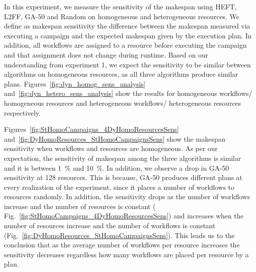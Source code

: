 In this experiment, we measure the sensitivity of the makespan using HEFT, L2FF, GA-50 and Random on homogeneous and heterogeneous resources.
We define as makespan sensitivity the difference between the makespan measured via executing a campaign and the expected makespan given by the execution plan.
In addition, all workflows are assigned to a resource before executing the campaign and that assignment does not change during runtime.
Based on our understanding from experiment 1, we expect the sensitivity to be similar between algorithms on homogeneous resources, as all three algorithms produce similar plans.
Figures~\ref{fig:dyn_homog_sens_analysis} and~\ref{fig:dyn_hetero_sens_analysis} show the results for homogeneous workflows/ homogeneous resources and heterogeneous workflows/ heterogeneous resources respectively.

Figures~\ref{fig:StHomoCampaigns_4DyHomoResourcesSens} and~\ref{fig:DyHomoResources_StHomoCampaignsSens} show the makespan sensitivity when workflows and resources are homogeneous.
As per our expectation, the sensitivity of makespan among the three algorithms is similar and it is between 1~\% and 10~\%.
In addition, we observe a drop in GA-50 sensitivity at 128 resources.
This is because, GA-50 produces different plans at every realization of the experiment, since it places a number of workflows to resources randomly.
In addition, the sensitivity drops as the number of workflows increase and the number of resources is constant ( Fig.~\ref{fig:StHomoCampaigns_4DyHomoResourcesSens}) and increases when the number of resources increase and the number of workflows is constant (Fig.~\ref{fig:DyHomoResources_StHomoCampaignsSens}).
This leads us to the conclusion that as the average number of workflows per resource increases the sensitivity decreases regardless how many workflows are placed per resource by a plan.



